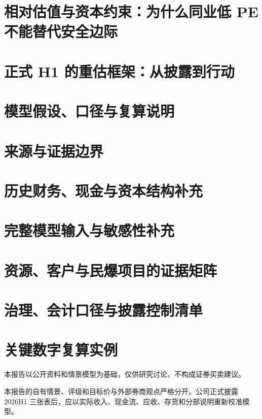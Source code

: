 \documentclass[a4paper,11pt,openany,fontset=none]{ctexrep}
\newcommand{\reportdisclaimer}{本报告以公开资料和情景模型为基础，仅供研究讨论，不构成证券买卖建议。}
\begin{document}
\chapter{相对估值与资本约束：为什么同业低 PE 不能替代安全边际}

\chapter{正式 H1 的重估框架：从披露到行动}


\appendix
\chapter{模型假设、口径与复算说明}

\chapter{来源与证据边界}

\chapter{历史财务、现金与资本结构补充}

\chapter{完整模型输入与敏感性补充}

\chapter{资源、客户与民爆项目的证据矩阵}

\chapter{治理、会计口径与披露控制清单}

\chapter{关键数字复算实例}

\clearpage
\thispagestyle{empty}
\vspace*{4cm}
\begin{disclosurebox}[免责声明]
\small
\reportdisclaimer\par
本报告的自有情景、评级和目标价与外部券商观点严格分开。公司正式披露 2026H1 三张表后，应以实际收入、现金流、应收、存货和分部说明重新校准模型。
\end{disclosurebox}
\end{document}
